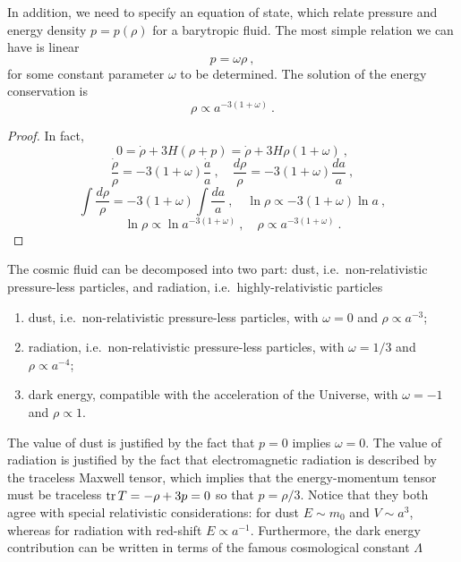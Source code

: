     In addition, we need to specify an equation of state, which relate pressure and energy density $p = p (\rho)$ for a barytropic fluid. The most simple relation we can have is linear 
    \begin{equation*}
        p = \omega \rho ~,
    \end{equation*}
    for some constant parameter $\omega$ to be determined. The solution of the energy conservation is 
    \begin{equation*}
        \rho \propto a^{- 3 (1 + \omega)} ~.
    \end{equation*}
    \begin{proof}
        In fact, 
        \begin{equation*}
            0 = \dot \rho + 3 H (\rho + p) = \dot \rho + 3 H \rho (1 + \omega) ~,
        \end{equation*}
        \begin{equation*}
            \frac{\dot \rho}{\rho} = - 3 (1 + \omega) \frac{\dot a}{a} ~, \quad 
            \frac{d \rho}{\rho} = - 3 (1 + \omega) \frac{d a}{a} ~,
        \end{equation*}
        \begin{equation*}
            \int \frac{d \rho}{\rho} = - 3 (1 + \omega) \int \frac{d a}{a} ~, \quad 
            \ln \rho \propto - 3 (1 + \omega) \ln a ~,
        \end{equation*}
        \begin{equation*}
            \ln \rho \propto \ln a^{- 3 (1 + \omega)} ~, \quad 
            \rho \propto a^{- 3 (1 + \omega)} ~.
        \end{equation*}
    \end{proof}
    The cosmic fluid can be decomposed into two part: dust, i.e.~non-relativistic pressure-less particles, and radiation, i.e.~highly-relativistic particles 
    \begin{enumerate}
        \item dust, i.e.~non-relativistic pressure-less particles, with $\omega = 0$ and $\rho \propto a^{-3}$;
        \item radiation, i.e.~non-relativistic pressure-less particles, with $\omega = 1/3$ and $\rho \propto a^{-4}$;
        \item dark energy, compatible with the acceleration of the Universe, with $\omega = -1$ and $\rho \propto 1$.
    \end{enumerate}
    The value of dust is justified by the fact that $p=0$ implies $\omega =0$. The value of radiation is justified by the fact that electromagnetic radiation is described by the traceless Maxwell tensor, which implies that the energy-momentum tensor must be traceless $\operatorname{tr} T = - \rho + 3 p = 0$ so that $p = \rho / 3$. Notice that they both agree with special relativistic considerations: for dust $E \sim m_0$ and $V \sim a^3$, whereas for radiation with red-shift $E \propto a^{-1}$. Furthermore, the dark energy contribution can be written in terms of the famous cosmological constant $\Lambda$
